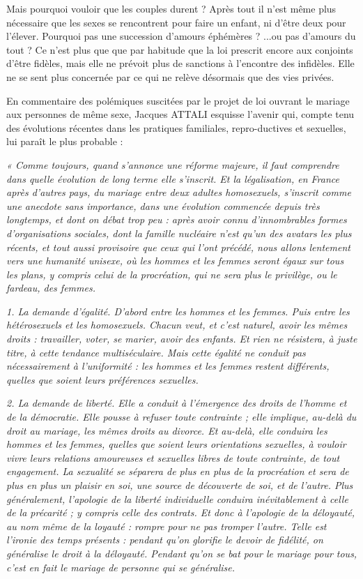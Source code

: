 Mais pourquoi vouloir que les couples durent ? Après tout il n'est même plus nécessaire que les sexes se rencontrent pour faire un enfant, ni d'être deux pour l'élever. Pourquoi pas une succession d'amours éphémères ?  ...ou pas d'amours du tout ? Ce n'est plus que que par habitude que la loi prescrit encore aux conjoints d'être fidèles, mais elle ne prévoit plus de sanctions à l'encontre des infidèles. Elle ne se sent plus concernée par ce qui ne relève désormais que des vies privées. 


En commentaire des polémiques suscitées par le projet de loi ouvrant le mariage aux personnes de même sexe, Jacques ATTALI esquisse l'avenir qui, compte tenu des évolutions récentes dans les pratiques familiales, repro-ductives et sexuelles, lui paraît le plus probable   : 
\begin{displayquote}
\emph{« Comme toujours, quand s'annonce une réforme majeure, il faut comprendre dans quelle évolution de long terme elle s'inscrit.
Et la légalisation, en France après d'autres pays, du mariage entre deux adultes homosexuels, s'inscrit comme une anecdote sans importance, dans une évolution commencée depuis très longtemps, et dont on débat trop peu : après avoir connu d'innombrables formes d'organisations sociales, dont la famille nucléaire n'est qu'un des avatars les plus récents, et tout aussi provisoire que ceux qui l'ont précédé, nous allons lentement vers une humanité unisexe, où les hommes et les femmes seront égaux sur tous les plans, y compris celui de la procréation, qui ne sera plus le privilège, ou le fardeau, des femmes.}

\emph{1. La demande d'égalité. D'abord entre les hommes et les femmes. Puis entre les hétérosexuels et les homosexuels. Chacun veut, et c'est naturel, avoir les mêmes droits : travailler, voter, se marier, avoir des enfants. Et rien ne résistera, à juste titre, à cette tendance multiséculaire. Mais cette égalité ne conduit pas nécessairement à l'uniformité : les hommes et les femmes restent différents, quelles que soient leurs préférences sexuelles.}

 \emph{2. La demande de liberté. Elle a conduit à l'émergence des droits de l'homme et de la démocratie. Elle pousse à refuser toute contrainte ; elle implique, au-delà du droit au mariage, les mêmes droits au divorce. Et au-delà, elle conduira les hommes et les femmes, quelles que soient leurs orientations sexuelles, à vouloir vivre leurs relations amoureuses et sexuelles libres de toute contrainte, de tout engagement. La sexualité se séparera de plus en plus de la procréation et sera de plus en plus un plaisir en soi, une source de découverte de soi, et de l'autre. Plus généralement, l'apologie de la liberté individuelle conduira inévitablement à celle de la précarité ; y compris celle des contrats. Et donc à l'apologie de la déloyauté, au nom même de la loyauté : rompre pour ne pas tromper l'autre. Telle est l'ironie des temps présents : pendant qu'on glorifie le devoir de fidélité, on généralise le droit à la déloyauté. Pendant qu'on se bat pour le mariage pour tous, c'est en fait le mariage de personne qui se généralise.}
 

\end{displayquote}
